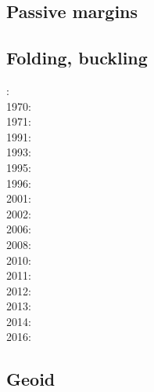 \subsection{Passive margins} 

{\scriptsize
\noindent
\cite{clwv82}
\cite{lies86}
\cite{gebi05}
\cite{clbz08}
\cite{kasb08}
\cite{fasm10}
\cite{nigm10}
\cite{rapy11}
\cite{nigm11}
\cite{brfo11}
\cite{mana13}
\cite{yahb13}
\cite{macg14}
\cite{gebw15}
\cite{nigo15}
\cite{sahf18}
\cite{mube18}
\cite{tebu18}
\cite{zhli19}
}

\subsection{Folding, buckling} 

{\scriptsize
{}: \cite{ramb68}\\
1970: \cite{ramb70}\\
1971: \cite{ramb71}\\
1991: \cite{flet91}\\
1993: \cite{zhhj93}\\
1995: \cite{flet95}\\
1996: \cite{zhho96}\\
2001: \cite{scpo01}\\
2002: \cite{mumh02}\\
2006: \cite{frsc06}\\
2008: \cite{schm08}\\
2010: \cite{resb10}\\
2011: \cite{freh11}\\
2012: \cite{reds12}\cite{grsc12}\cite{scsc12}\\
2013: \cite{regc13}\\
2014: \cite{freh14}\cite{frex14}\\
2016: \cite{frsc16}
}

\subsection{Geoid}

